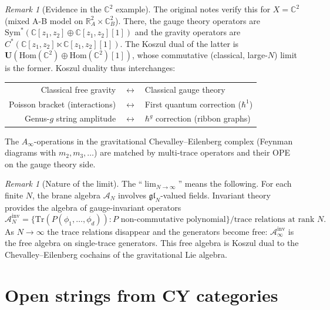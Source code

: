 \documentclass[11pt]{article}
\theoremstyle{definition}
\theoremstyle{remark}
\newtheorem{remark}[theorem]{Remark}
\newcommand{\Hom}{\mathrm{Hom}}
\newcommand{\Sym}{\mathrm{Sym}}
\newcommand{\Tr}{\mathrm{Tr}}
\newcommand{\cA}{\mathcal{A}}
\newcommand{\frakgl}{\mathfrak{gl}}
\begin{document}
\begin{remark}[Evidence in the $\mathbb{C}^2$ example]
The original notes verify this for $X = \mathbb{C}^2$ (mixed A-B model on
$\mathbb{R}^2_A \times \mathbb{C}^2_B$). There, the gauge theory operators
are $\Sym^*(\mathbb{C}[z_1, z_2] \oplus \mathbb{C}[z_1, z_2][1])$ and the
gravity operators are $C^*(\mathbb{C}[z_1, z_2] \ltimes \mathbb{C}[z_1,
z_2][1])$. The Koszul dual of the latter is $\mathbf{U}(\Hom(\mathbb{C}^2)
\oplus \Hom(\mathbb{C}^2)[1])$, whose commutative (classical, large-$N$) limit
is the former. Koszul duality thus interchanges:
\begin{center}
\begin{tabular}{rcl}
 Classical free gravity & $\longleftrightarrow$ & Classical gauge theory \\
 Poisson bracket (interactions) & $\longleftrightarrow$ &
 First quantum correction ($\hbar^1$) \\
 Genus-$g$ string amplitude & $\longleftrightarrow$ &
 $\hbar^g$ correction (ribbon graphs)
\end{tabular}
\end{center}
The $A_\infty$-operations in the gravitational Chevalley--Eilenberg complex
(Feynman diagrams with $m_2, m_3, \ldots$) are matched by multi-trace
operators and their OPE on the gauge theory side.
\end{remark}

\begin{remark}[Nature of the limit]
The ``$\lim_{N \to \infty}$'' means the following. For each
finite $N$, the brane algebra $\cA_N$ involves $\frakgl_N$-valued fields.
Invariant theory provides the algebra of gauge-invariant operators
\[
 \cA_N^{\mathrm{inv}} = \bigl\{
 \Tr(P(\phi_1, \ldots, \phi_d)) : P \text{ non-commutative polynomial}
 \bigr\} / \text{trace relations at rank } N.
\]
As $N \to \infty$ the trace relations disappear and the generators become free:
$\cA_\infty^{\mathrm{inv}}$ is the free algebra on single-trace generators.
This free algebra is Koszul dual to the Chevalley--Eilenberg cochains of the
gravitational Lie algebra.
\end{remark}


\section{Open strings from CY categories}
\label{sec:open-strings}
\end{document}
